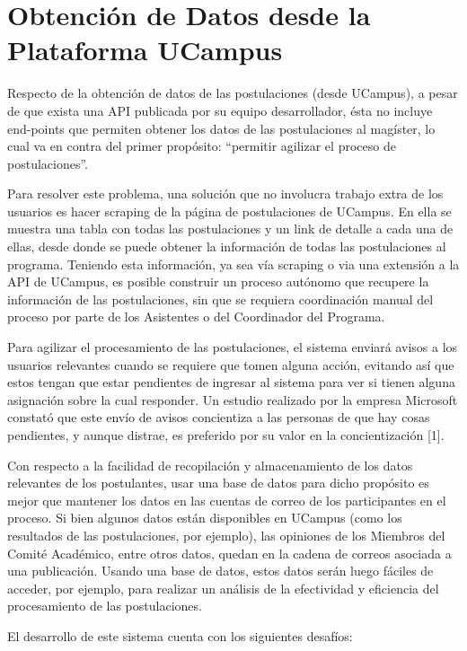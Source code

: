 \section{Obtención de Datos desde la Plataforma UCampus}

Respecto de la obtención de datos de las postulaciones (desde UCampus), a pesar
de que exista una API publicada por su equipo desarrollador, ésta no incluye
end-points que permiten obtener los datos de las postulaciones al magíster, lo
cual va en contra del primer propósito: “permitir agilizar el proceso de
postulaciones”. 

Para resolver este problema, una solución que no involucra trabajo extra de los
usuarios es hacer scraping de la página de postulaciones de UCampus. En ella se
muestra una tabla con todas las postulaciones y un link de detalle a cada una de
ellas, desde donde se puede obtener la información de todas las postulaciones al
programa. Teniendo esta información, ya sea vía scraping o via una extensión a
la API de UCampus, es posible construir un proceso autónomo que recupere la
información de las postulaciones, sin que se requiera coordinación manual del
proceso por parte de los Asistentes o del Coordinador del Programa.

Para agilizar el procesamiento de las postulaciones, el sistema enviará avisos a
los usuarios relevantes cuando se requiere que tomen alguna acción, evitando así
que estos tengan que estar pendientes de ingresar al sistema para ver si tienen
alguna asignación sobre la cual responder. Un estudio realizado por la empresa
Microsoft constató que este envío de avisos concientiza a las personas de que
hay cosas pendientes, y aunque distrae, es preferido por su valor en la
concientización [1].

Con respecto a la facilidad de recopilación y almacenamiento de los datos
relevantes de los postulantes, usar una base de datos para dicho propósito es
mejor que mantener los datos en las cuentas de correo de los participantes en el
proceso. Si bien algunos datos están disponibles en UCampus (como los resultados
de las postulaciones, por ejemplo), las opiniones de los Miembros del Comité
Académico, entre otros datos, quedan en la cadena de correos asociada a una
publicación. Usando una base de datos, estos datos serán luego fáciles de
acceder, por ejemplo, para realizar un análisis de la efectividad y eficiencia
del procesamiento de las postulaciones.

El desarrollo de este sistema cuenta con los siguientes desafíos:

